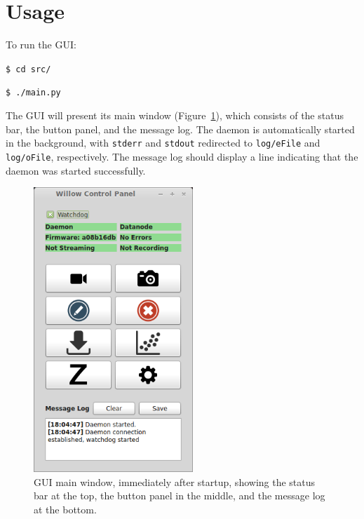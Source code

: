 
\section{Usage}
\label{sec_usage}

To run the GUI:

\vspace{5mm}
\texttt{\$ cd src/}

\texttt{\$ ./main.py}
\vspace{5mm}

\noindent
The GUI will present its main window (Figure~\ref{fig_mainwindow}), which consists of the status bar, the button panel, and the message log. The daemon is automatically started in the background, with \texttt{stderr} and \texttt{stdout} redirected to \texttt{log/eFile} and \texttt{log/oFile}, respectively. The message log should display a line indicating that the daemon was started successfully.

\begin{figure}[h!]
\begin{center}
\includegraphics[width=6cm]{screenshots/mainwindow.png}
\end{center}
\caption{GUI main window, immediately after startup, showing the status bar at the top, the button panel in the middle, and the message log at the bottom.}
\label{fig_mainwindow}
\end{figure}



